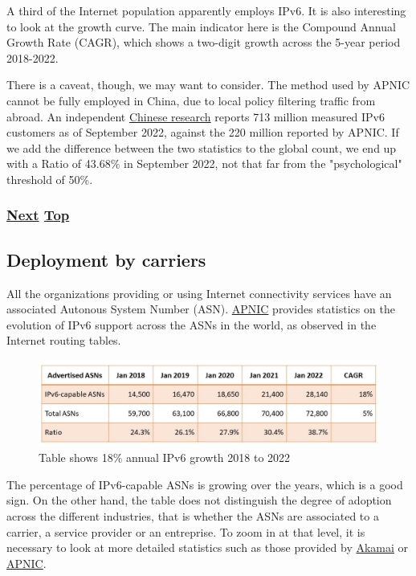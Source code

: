 \documentclass[
]{article}
\begin{document}
A third of the Internet population apparently employs IPv6. It is also
interesting to look at the growth curve. The main indicator here is the
Compound Annual Growth Rate (CAGR), which shows a two-digit growth
across the 5-year period 2018-2022.

There is a caveat, though, we may want to consider. The method used by
APNIC cannot be fully employed in China, due to local policy filtering
traffic from abroad. An independent
\href{https://www.china-ipv6.cn/\#/activeconnect/simpleInfo}{Chinese
research} reports 713 million measured IPv6 customers as of September
2022, against the 220 million reported by APNIC. If we add the
difference between the two statistics to the global count, we end up
with a Ratio of 43.68\% in September 2022, not that far from the
"psychological" threshold of 50\%.

\subsubsection{\texorpdfstring{\hyperref[deployment-by-carriers]{Next}
\hyperref[deployment-status]{Top}}{Next Top}}\label{next-top-7}

\pagebreak

\subsection{Deployment by carriers}\label{deployment-by-carriers}

All the organizations providing or using Internet connectivity services
have an associated Autonous System Number (ASN).
\href{https://blog.apnic.net/2022/01/06/bgp-in-2021-the-bgp-table/}{APNIC}
provides statistics on the evolution of IPv6 support across the ASNs in
the world, as observed in the Internet routing tables.

\begin{figure}
\centering
\includegraphics{Section5_Table2.jpg}
\caption{Table shows 18\% annual IPv6 growth 2018 to 2022}
\end{figure}

The percentage of IPv6-capable ASNs is growing over the years, which is
a good sign. On the other hand, the table does not distinguish the
degree of adoption across the different industries, that is whether the
ASNs are associated to a carrier, a service provider or an entreprise.
To zoom in at that level, it is necessary to look at more detailed
statistics such as those provided by
\href{https://www.akamai.com/internet-station/cyber-attacks/state-of-the-internet-report/ipv6-adoption-visualization}{Akamai}
or \href{https://stats.labs.apnic.net}{APNIC}.
\end{document}
